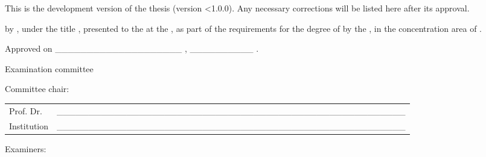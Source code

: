 \documentclass[
12pt,
openright,
oneside,
a4paper,
chapter=TITLE,
section=TITLE,
french,
spanish,
brazil,
english
]{abntex2}
\providecommand{\imprimiruniversidade}{}
\providecommand{\imprimirescola}{}
\providecommand{\imprimirprograma}{}
\providecommand{\imprimirtituloacademico}{}
\providecommand{\imprimirareadeconcentracao}{}
\renewcommand{\arraystretch}{1.5}
\begin{document}

\begin{errata}
This is the development version of the thesis (version \textless1.0.0).
Any necessary corrections will be listed here after its approval.
\end{errata}


\begin{folhadeaprovacao}
  \noindent
{\imprimirtipotrabalho} by {\imprimirautor}, under the title \textbf{\imprimirtitulo}, presented to the {\imprimirescola} at the {\imprimiruniversidade}, as part of the requirements for the degree of {\imprimirtituloacademico} by the {\imprimirprograma}, in the concentration area of {\imprimirareadeconcentracao}.
  \par\vspace*{1.5cm}
  \noindent Approved on \_\_\_\_\_\_\_\_\_\_\_\_\_\_\_\_\_\_\_\_ , \_\_\_\_\_\_\_\_\_\_ .

  \vspace*{1.5cm}

  \begin{center}
    \noindent Examination committee
  \end{center}

  \vspace*{0.5cm}

  \noindent Committee chair:

  \vspace*{0.25cm}

  \renewcommand{\arraystretch}{2}
  \setlength{\arrayrulewidth}{0pt}
  \setlength{\tabcolsep}{0pt}
  \noindent
  \begin{tabular}{m{2cm} P{14cm}}
    Prof. Dr. & \_\_\_\_\_\_\_\_\_\_\_\_\_\_\_\_\_\_\_\_\_\_\_\_\_\_\_\_\_\_\_\_\_\_\_\_\_\_\_\_\_\_\_\_\_\_\_\_\_\_\_\_\_\_\_ \\
    Institution & \_\_\_\_\_\_\_\_\_\_\_\_\_\_\_\_\_\_\_\_\_\_\_\_\_\_\_\_\_\_\_\_\_\_\_\_\_\_\_\_\_\_\_\_\_\_\_\_\_\_\_\_\_\_\_ \\
  \end{tabular}

  \vspace*{1cm}

  \noindent Examiners:


\end{folhadeaprovacao}
\end{document}
